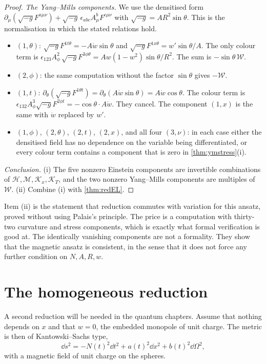 \begin{proof}
\emph{The Yang--Mills components.} We use the densitised form $\partial_\mu(\sqrt{-g}F^{a\mu\nu})+\sqrt{-g}\,\epsilon_{abc}A^b_\mu F^{c\mu\nu}$ with $\sqrt{-g}=AR^2\sin\theta$. This is the normalisation in which the stated relations hold.
\begin{itemize}
\item $(1,\theta)$: $\sqrt{-g}F^{1t\theta}=-A\dot w\sin\theta$ and $\sqrt{-g}F^{1x\theta}=w'\sin\theta/A$. The only colour term is $\epsilon_{123}A^2_\phi\,\sqrt{-g}F^{3\phi\theta}=Aw(1-w^2)\sin\theta/R^2$. The sum is $-\sin\theta\,\mathcal W$.
\item $(2,\phi)$: the same computation without the factor $\sin\theta$ gives $-\mathcal W$.
\item $(1,t)$: $\partial_\theta(\sqrt{-g}F^{1\theta t})=\partial_\theta(A\dot w\sin\theta)=A\dot w\cos\theta$. The colour term is $\epsilon_{132}A^3_\phi\sqrt{-g}F^{2\phi t}=-\cos\theta\cdot A\dot w$. They cancel. The component $(1,x)$ is the same with $\dot w$ replaced by $w'$.
\item $(1,\phi)$, $(2,\theta)$, $(2,t)$, $(2,x)$, and all four $(3,\nu)$: in each case either the densitised field has no dependence on the variable being differentiated, or every colour term contains a component that is zero in \cref{thm:ymstress}(i).
\end{itemize}

\emph{Conclusion.} (i) The five nonzero Einstein components are invertible combinations of $\mathcal H,\mathcal M,\mathcal K_x,\mathcal K_T$, and the two nonzero Yang--Mills components are multiples of $\mathcal W$. (ii) Combine (i) with \cref{thm:redEL}.
\end{proof}


Item (ii) is the statement that reduction commutes with variation for this ansatz, proved without using Palais's principle. The price is a computation with thirty-two curvature and stress components, which is exactly what formal verification is good at. The identically vanishing components are not a formality. They show that the magnetic ansatz is consistent, in the sense that it does not force any further condition on $N,A,R,w$.

\section{The homogeneous reduction}

A second reduction will be needed in the quantum chapters. Assume that nothing depends on $x$ and that $w=0$, the embedded monopole of unit charge. The metric is then of Kantowski--Sachs type,
\[
\dd s^2=-N(t)^2\dd t^2+a(t)^2\dd x^2+b(t)^2\dd\Omega^2,
\]
with a magnetic field of unit charge on the spheres.

